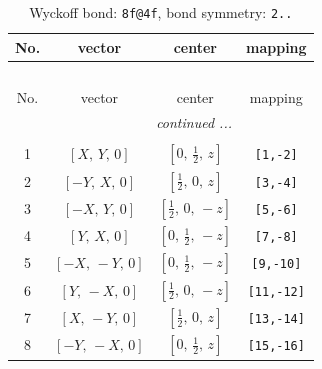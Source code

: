 \documentclass[fleqn,8pt]{jsarticle}
\begin{document}
\begin{longtable}{cccc}
\caption{Wyckoff bond: {\tt 8f@4f}, bond symmetry: {\tt 2..}}
 \\
 \hline \hline
No. & vector & center & mapping \\ \hline \endfirsthead

\multicolumn{3}{l}{\tablename\ \thetable{}} \\
 \hline \hline
No. & vector & center & mapping \\ \hline \endhead

 \hline \hline
\multicolumn{3}{r}{\footnotesize\it continued ...} \\ \endfoot

 \hline \hline
\multicolumn{3}{r}{} \\ \endlastfoot

1 & $\left[ X,\, Y,\, 0 \right]$ & $\left[ 0,\, \frac{1}{2},\, z \right]$ & {\tt [1,-2]} \\ \hline
2 & $\left[ - Y,\, X,\, 0 \right]$ & $\left[ \frac{1}{2},\, 0,\, z \right]$ & {\tt [3,-4]} \\ \hline
3 & $\left[ - X,\, Y,\, 0 \right]$ & $\left[ \frac{1}{2},\, 0,\, - z \right]$ & {\tt [5,-6]} \\ \hline
4 & $\left[ Y,\, X,\, 0 \right]$ & $\left[ 0,\, \frac{1}{2},\, - z \right]$ & {\tt [7,-8]} \\ \hline
5 & $\left[ - X,\, - Y,\, 0 \right]$ & $\left[ 0,\, \frac{1}{2},\, - z \right]$ & {\tt [9,-10]} \\ \hline
6 & $\left[ Y,\, - X,\, 0 \right]$ & $\left[ \frac{1}{2},\, 0,\, - z \right]$ & {\tt [11,-12]} \\ \hline
7 & $\left[ X,\, - Y,\, 0 \right]$ & $\left[ \frac{1}{2},\, 0,\, z \right]$ & {\tt [13,-14]} \\ \hline
8 & $\left[ - Y,\, - X,\, 0 \right]$ & $\left[ 0,\, \frac{1}{2},\, z \right]$ & {\tt [15,-16]} \\
\end{longtable}
\renewcommand{\arraystretch}{1.2}
\end{document}
